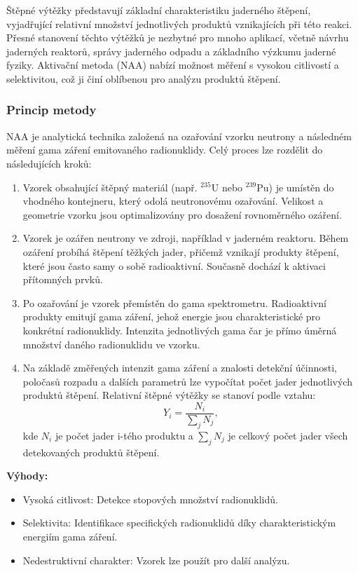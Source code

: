 Štěpné výtěžky představují základní charakteristiku jaderného štěpení, vyjadřující relativní množství jednotlivých produktů vznikajících při této reakci. Přesné stanovení těchto výtěžků je nezbytné pro mnoho aplikací, včetně návrhu jaderných reaktorů, správy jaderného odpadu a základního výzkumu jaderné fyziky. Aktivační metoda (NAA) nabízí možnost měření s vysokou citlivostí a selektivitou, což ji činí oblíbenou pro analýzu produktů štěpení.

\subsubsection*{Princip metody}

NAA je analytická technika založená na ozařování vzorku neutrony a následném měření gama záření emitovaného radionuklidy. Celý proces lze rozdělit do následujících kroků:

\begin{enumerate}
    \item Vzorek obsahující štěpný materiál (např. $^{235}$U nebo $^{239}$Pu) je umístěn do vhodného kontejneru, který odolá neutronovému ozařování. Velikost a geometrie vzorku jsou optimalizovány pro dosažení rovnoměrného ozáření.
    \item Vzorek je ozářen neutrony ve zdroji, například v jaderném reaktoru. Během ozáření probíhá štěpení těžkých jader, přičemž vznikají produkty štěpení, které jsou často samy o sobě radioaktivní. Současně dochází k aktivaci přítomných prvků.
    \item Po ozařování je vzorek přemístěn do gama spektrometru. Radioaktivní produkty emitují gama záření, jehož energie jsou charakteristické pro konkrétní radionuklidy. Intenzita jednotlivých gama čar je přímo úměrná množství daného radionuklidu ve vzorku.
    \item Na základě změřených intenzit gama záření a znalosti detekční účinnosti, poločasů rozpadu a dalších parametrů lze vypočítat počet jader jednotlivých produktů štěpení. Relativní štěpné výtěžky se stanoví podle vztahu:
\begin{equation}
    \boxed{Y_i = \frac{N_i}{\sum_j N_j},}
\end{equation}
kde $N_i$ je počet jader i-tého produktu a $\sum_j N_j$ je celkový počet jader všech detekovaných produktů štěpení.
\end{enumerate}

\textbf{Výhody:}

\begin{itemize}
    \item Vysoká citlivost: Detekce stopových množství radionuklidů.
    \item Selektivita: Identifikace specifických radionuklidů díky charakteristickým energiím gama záření.
    \item Nedestruktivní charakter: Vzorek lze použít pro další analýzu.
\end{itemize}

